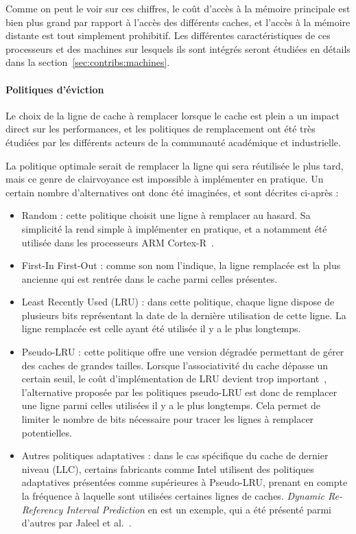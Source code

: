 Comme on peut le voir sur ces chiffres, le coût d'accès à la mémoire principale est bien plus grand par rapport à l'accès des différents caches, et l'accès à la mémoire distante est tout simplement prohibitif.
Les différentes caractéristiques de ces processeurs et des machines sur lesquels ils sont intégrés seront étudiées en détails dans la section~\ref{sec:contribs:machines}.

\paragraph{Politiques d'éviction}

Le choix de la ligne de cache à remplacer lorsque le cache est plein a un impact direct sur les performances, et les politiques de remplacement ont été très étudiées par les différents acteurs de la communauté académique et industrielle.

La politique optimale serait de remplacer la ligne qui sera réutilisée le plus tard, mais ce genre de clairvoyance est impossible à implémenter en pratique.
Un certain nombre d'alternatives ont donc été imaginées, et sont décrites ci-après :
\begin{itemize}
  \item Random : cette politique choisit une ligne à remplacer au hasard. Sa simplicité la rend simple à implémenter en pratique, et a notamment été utilisée dans les processeurs ARM Cortex-R~\cite{ARM-Cortex-R}.
  \item First-In First-Out : comme son nom l'indique, la ligne remplacée est la plus ancienne qui est rentrée dans le cache parmi celles présentes.
  \item Least Recently Used (LRU) : dans cette politique, chaque ligne dispose de plusieurs bits représentant la date de la dernière utilisation de cette ligne. La ligne remplacée est celle ayant été utilisée il y a le plus longtemps.
  \item Pseudo-LRU : cette politique offre une version dégradée permettant de gérer des caches de grandes tailles.
Lorsque l'associativité du cache dépasse un certain seuil, le coût d'implémentation de LRU devient trop important~\cite{Kedzierski2010}, l'alternative proposée par les politiques pseudo-LRU est donc de remplacer une ligne parmi celles utilisées il y a le plus longtemps.
Cela permet de limiter le nombre de bits nécessaire pour tracer les lignes à remplacer potentielles.
  \item Autres politiques adaptatives : dans le cas spécifique du cache de dernier niveau (LLC), certains fabricants comme Intel utilisent des politiques adaptatives présentées comme supérieures à Pseudo-LRU, prenant en compte la fréquence à laquelle sont utilisées certaines lignes de caches.
    \emph{Dynamic Re-Referency Interval Prediction} en est un exemple, qui a été présenté parmi d'autres par Jaleel et al.~\cite{Jaleel2010}.
\end{itemize}

